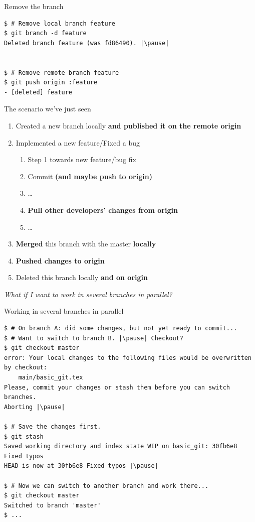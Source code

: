 \begin{frame}[fragile]{Remove the branch}
  	\begin{lstlisting}
$ # Remove local branch feature
$ git branch -d feature
Deleted branch feature (was fd86490). |\pause|


$ # Remove remote branch feature
$ git push origin :feature
- [deleted] feature
	\end{lstlisting}
\end{frame}


\begin{frame}[fragile]{The scenario we've just seen}
	\begin{enumerate}
		\item Created a new branch locally \textbf{and published it on the remote origin}
		\item Implemented a new feature/Fixed a bug
		\begin{enumerate}
			\item Step 1 towards new feature/bug fix
			\item Commit \textbf{(and maybe push to origin)}
			\item \ldots
			\item \textbf{Pull other developers' changes from origin}
			\item \ldots
		\end{enumerate}
		\item \textbf{Merged} this branch with the master \textbf{locally}
		\item \textbf{Pushed changes to origin}
		\item Deleted this branch locally \textbf{and on origin}
	\end{enumerate}
	\pause
	\textit{What if I want to work in several branches in parallel?}
\end{frame}

\begin{frame}[fragile]{Working in several branches in parallel}
	\begin{tiny}
		\begin{lstlisting}
$ # On branch A: did some changes, but not yet ready to commit...
$ # Want to switch to branch B. |\pause| Checkout?
$ git checkout master
error: Your local changes to the following files would be overwritten by checkout:
	main/basic_git.tex
Please, commit your changes or stash them before you can switch branches.
Aborting |\pause|

$ # Save the changes first.
$ git stash
Saved working directory and index state WIP on basic_git: 30fb6e8 Fixed typos
HEAD is now at 30fb6e8 Fixed typos |\pause|

$ # Now we can switch to another branch and work there...
$ git checkout master
Switched to branch 'master'
$ ...
		\end{lstlisting}
	\end{tiny}
\end{frame}


